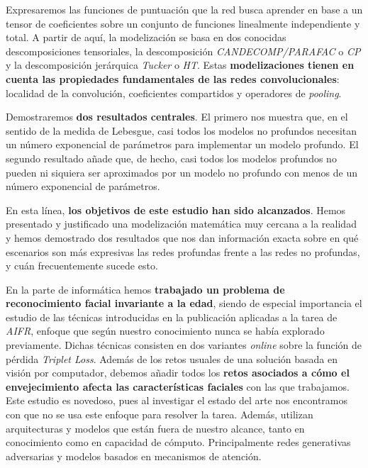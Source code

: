 Expresaremos las funciones de puntuación que la red busca aprender en base a un tensor de coeficientes sobre un conjunto de funciones linealmente independiente y total. A partir de aquí, la modelización se basa en dos conocidas descomposiciones tensoriales, la descomposición \textit{CANDECOMP/PARAFAC} o \textit{CP} y la descomposición jerárquica \textit{Tucker} o \textit{HT}. Estas \textbf{modelizaciones tienen en cuenta las propiedades fundamentales de las redes convolucionales}: localidad de la convolución, coeficientes compartidos y operadores de \textit{pooling}.

Demostraremos \textbf{dos resultados centrales}. El primero nos muestra que, en el sentido de la medida de Lebesgue, casi todos los modelos no profundos necesitan un número exponencial de parámetros para implementar un modelo profundo. El segundo resultado añade que, de hecho, casi todos los modelos profundos no pueden ni siquiera ser aproximados por un modelo no profundo con menos de un número exponencial de parámetros.

En esta línea, \textbf{los objetivos de este estudio han sido alcanzados}. Hemos presentado y justificado una modelización matemática muy cercana a la realidad y hemos demostrado dos resultados que nos dan información exacta sobre en qué escenarios son más expresivas las redes profundas frente a las redes no profundas, y cuán frecuentemente sucede esto.

En la parte de informática hemos \textbf{trabajado un problema de reconocimiento facial invariante a la edad}, siendo de especial importancia el estudio de las técnicas introducidas en la publicación \cite{informatica:principal} aplicadas a la tarea de \textit{AIFR}, enfoque que según nuestro conocimiento nunca se había explorado previamente. Dichas técnicas consisten en dos variantes \textit{online} sobre la función de pérdida \textit{Triplet Loss}.  Además de los retos usuales de una solución basada en visión por computador, debemos añadir todos los \textbf{retos asociados a cómo el envejecimiento afecta las características faciales} con las que trabajamos. Este estudio es novedoso, pues al investigar el estado del arte nos encontramos con que no se usa este enfoque para resolver la tarea. Además, utilizan arquitecturas y modelos que están fuera de nuestro alcance, tanto en conocimiento como en capacidad de cómputo. Principalmente redes generativas adversarias y modelos basados en mecanismos de atención.

